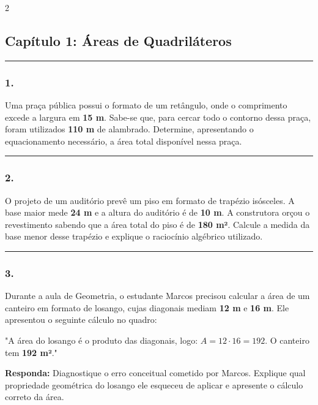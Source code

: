 \documentclass[twoside, 10pt, a4paper]{article}
\newlength{\espacoPosTitulo}\setlength{\espacoPosTitulo}{0.3cm}
\newlength{\espacoPreQuestao}\setlength{\espacoPreQuestao}{0.1cm}
\newlength{\espacoQuestao}\setlength{\espacoQuestao}{0.2cm}
\begin{document}
\par\vspace{0.3cm} 
\raggedcolumns
\begin{multicols*}{2}
\vspace{0.1cm}

\subsection*{Capítulo 1: Áreas de Quadriláteros}
\vspace{-0.2cm}\noindent\rule{\linewidth}{1.5pt} 
\par\vspace{\espacoPosTitulo}
\subsubsection*{1.} Uma praça pública possui o formato de um retângulo, onde o comprimento excede a largura em \textbf{15 m}. Sabe-se que, para cercar todo o contorno dessa praça, foram utilizados \textbf{110 m} de alambrado. Determine, apresentando o equacionamento necessário, a área total disponível nessa praça.
\par\vspace{\espacoQuestao}

\noindent\textcolor{CorLinha}{\rule{\linewidth}{0.5pt}} 
\par\vspace{\espacoPreQuestao}
\subsubsection*{2.} O projeto de um auditório prevê um piso em formato de trapézio isósceles. A base maior mede \textbf{24 m} e a altura do auditório é de \textbf{10 m}. A construtora orçou o revestimento sabendo que a área total do piso é de \textbf{180 m²}. Calcule a medida da base menor desse trapézio e explique o raciocínio algébrico utilizado.
\par\vspace{\espacoQuestao}

\noindent\textcolor{CorLinha}{\rule{\linewidth}{0.5pt}}
\par\vspace{\espacoPreQuestao}
\subsubsection*{3.} Durante a aula de Geometria, o estudante Marcos precisou calcular a área de um canteiro em formato de losango, cujas diagonais mediam \textbf{12 m} e \textbf{16 m}. Ele apresentou o seguinte cálculo no quadro:
\par
"A área do losango é o produto das diagonais, logo: $ A = 12 \cdot 16 = 192 $. O canteiro tem \textbf{192 m²}."
\begin{boxresponda}
\textbf{Responda:} Diagnostique o erro conceitual cometido por Marcos. Explique qual propriedade geométrica do losango ele esqueceu de aplicar e apresente o cálculo correto da área.
\end{boxresponda}
\par\vspace{\espacoQuestao}


\end{multicols*}
\end{document}

